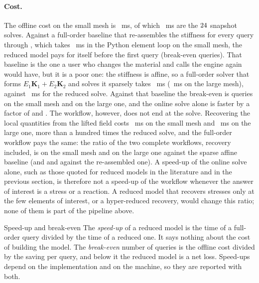 \paragraph{Cost.}
The offline cost on the small mesh is \cplSOff~ms, of which \cplSOffSnap~ms are the $24$ snapshot solves. Against a full-order baseline that re-assembles the stiffness for every query through , which takes \cplSTFomreasm~ms in the Python element loop on the small mesh, the reduced model pays for itself before the first query (break-even \cplSBeReasm{} queries). That baseline is the one a user who changes the material and calls the engine again would have, but it is a poor one: the stiffness is affine, so a full-order solver that forms $E_1\bm K_1+E_2\bm K_2$ and solves it sparsely takes \cplSTFomsparse~ms (\cplLTFomsparse~ms on the large mesh), against \cplSTRom~ms for the reduced solve. Against that baseline the break-even is \cplSBeSparse{} queries on the small mesh and \cplLBeSparse{} on the large one, and the online solve alone is faster by a factor of \cplSSpeedSparse{} and \cplLSpeedSparse. The workflow, however, does not end at the solve. Recovering the local quantities from the lifted field costs \cplSTRecover~ms on the small mesh and \cplLTRecover~ms on the large one, more than a hundred times the reduced solve, and the full-order workflow pays the same: the ratio of the two complete workflows, recovery included, is \cplSSpeedFlowSparse{} on the small mesh and \cplLSpeedFlowSparse{} on the large one against the sparse affine baseline (and \cplSSpeedFlowReasm{} and \cplLSpeedFlowReasm{} against the re-assembled one). A speed-up of the online solve alone, such as those quoted for reduced models in the literature and in the previous section, is therefore not a speed-up of the workflow whenever the answer of interest is a stress or a reaction. A reduced model that recovers stresses only at the few elements of interest, or a hyper-reduced recovery, would change this ratio; none of them is part of the pipeline above.

\begin{sidenote}{Speed-up and break-even}
The \emph{speed-up} of a reduced model is the time of a full-order query divided by the time of a reduced one. It says nothing about the cost of building the model. The \emph{break-even} number of queries is the offline cost divided by the saving per query, and below it the reduced model is a net loss. Speed-ups depend on the implementation and on the machine, so they are reported with both.
\end{sidenote}

